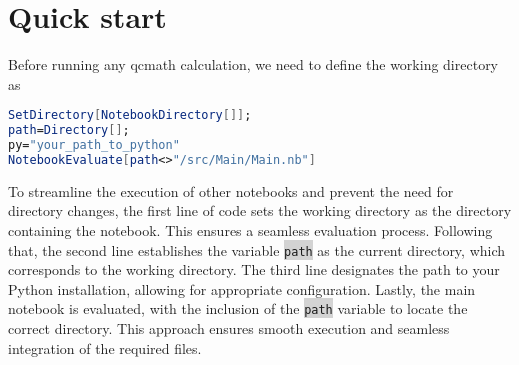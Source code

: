 \documentclass[aip,jcp,reprint,noshowkeys,superscriptaddress]{revtex4-1}
\newcommand{\keyword}[1]{{\colorbox{lightgray}{\texttt{#1}}}}
\begin{document}
\section{Quick start}
Before running any qcmath calculation, we need to define the working directory as 
\begin{lstlisting}[extendedchars=true,language=Mathematica]
SetDirectory[NotebookDirectory[]];
path=Directory[];
py="your_path_to_python"
NotebookEvaluate[path<>"/src/Main/Main.nb"]
\end{lstlisting}
To streamline the execution of other notebooks and prevent the need for directory changes, the first line of code sets the working directory as the directory containing the notebook. This ensures a seamless evaluation process. Following that, the second line establishes the variable \keyword{path} as the current directory, which corresponds to the working directory. The third line designates the path to your Python installation, allowing for appropriate configuration. Lastly, the main notebook is evaluated, with the inclusion of the \keyword{path} variable to locate the correct directory. This approach ensures smooth execution and seamless integration of the required files.
\end{document}
